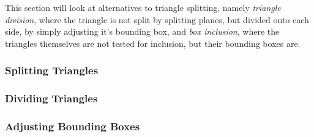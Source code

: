 This section will look at alternatives to triangle splitting, namely
\textit{triangle division}, where the triangle is not split by
splitting planes, but divided onto each side, by simply adjusting it's
bounding box, and \textit{box inclusion}, where the triangles
themselves are not tested for inclusion, but their bounding boxes are.




\subsubsection{Splitting Triangles}


\subsubsection{Dividing Triangles}





\subsubsection{Adjusting Bounding Boxes}






